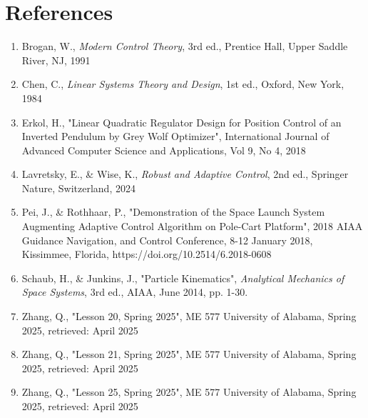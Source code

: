 \documentclass[titlepage]{article}
\begin{document}
\section{References}
\begin{enumerate}

\item{Brogan, W., \textit{Modern Control Theory}, 3rd ed., Prentice Hall, Upper Saddle River, NJ, 1991}

\item{Chen, C., \textit{Linear Systems Theory and Design}, 1st ed., Oxford, New York, 1984}

\item{Erkol, H., "Linear Quadratic Regulator Design for Position Control of an Inverted Pendulum by Grey Wolf Optimizer", International Journal of Advanced Computer Science and Applications, Vol 9, No 4, 2018}

\item{Lavretsky, E., \& Wise, K., \textit{Robust and Adaptive Control}, 2nd ed., Springer Nature, Switzerland, 2024}

\item{Pei, J., \& Rothhaar, P., "Demonstration of the Space Launch System Augmenting Adaptive Control Algorithm on Pole-Cart Platform", 2018 AIAA Guidance Navigation, and Control Conference, 8-12 January 2018, Kissimmee, Florida, https://doi.org/10.2514/6.2018-0608}

\item{Schaub, H., \& Junkins, J., "Particle Kinematics",  \textit{Analytical Mechanics of Space Systems}, 3rd ed., AIAA, June 2014, pp. 1-30.}

\item{Zhang, Q., "Lesson 20, Spring 2025", ME 577 University of Alabama, Spring 2025, retrieved: April 2025}

\item{Zhang, Q., "Lesson 21, Spring 2025", ME 577 University of Alabama, Spring 2025, retrieved: April 2025}

\item{Zhang, Q., "Lesson 25, Spring 2025", ME 577 University of Alabama, Spring 2025, retrieved: April 2025}


\end{enumerate}
\end{document}

